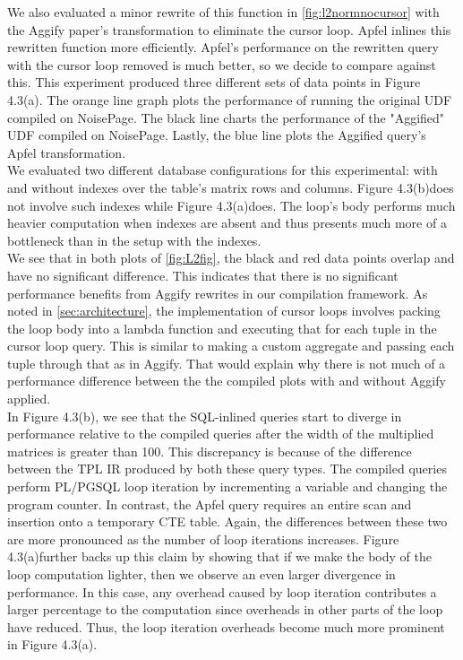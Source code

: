 \documentclass[12pt]{cmuthesis}
\newcommand{\sysname}{NoisePage\xspace}
\newcommand{\lnormwithindexesref}{Figure 4.3(a)}
\newcommand{\lnormnoindexesref}{Figure 4.3(b)}
\begin{document}
     We also evaluated a minor rewrite of this function in \cref{fig:l2normnocursor} with the Aggify paper's transformation to eliminate the cursor loop. Apfel inlines this rewritten function more efficiently. Apfel's performance on the rewritten query with the cursor loop removed is much better, so we decide to compare against this. This experiment produced three different sets of data points in \lnormwithindexesref. The orange line graph plots the performance of running the original UDF compiled on \sysname. The black line charts the performance of the "Aggified" UDF compiled on \sysname. Lastly, the blue line plots the Aggified query's Apfel transformation.\\

We evaluated two different database configurations for this experimental: with and without indexes over the table's matrix rows and columns. \lnormnoindexesref does not involve such indexes while \lnormwithindexesref does. The loop's body performs much heavier computation when indexes are absent and thus presents much more of a bottleneck than in the setup with the indexes.\\

    We see that in both plots of \cref{fig:L2fig}, the black and red data points overlap and have no significant difference. This indicates that there is no significant performance benefits from Aggify rewrites in our compilation framework. As noted in \cref{sec:architecture}, the implementation of cursor loops involves packing the loop body into a lambda function and executing that for each tuple in the cursor loop query. This is similar to making a custom aggregate and passing each tuple through that as in Aggify. That would explain why there is not much of a performance difference between the the compiled plots with and without Aggify applied.\\

    In \lnormnoindexesref, we see that the SQL-inlined queries start to diverge in performance relative to the compiled queries after the width of the multiplied matrices is greater than 100. This discrepancy is because of the difference between the TPL IR produced by both these query types. The compiled queries perform PL/PGSQL loop iteration by incrementing a variable and changing the program counter. In contrast, the Apfel query requires an entire scan and insertion onto a temporary CTE table. Again, the differences between these two are more pronounced as the number of loop iterations increases. \lnormwithindexesref further backs up this claim by showing that if we make the body of the loop computation lighter, then we observe an even larger divergence in performance. In this case, any overhead caused by loop iteration contributes a larger percentage to the computation since overheads in other parts of the loop have reduced. Thus, the loop iteration overheads become much more prominent in \lnormwithindexesref. \\
\end{document}
